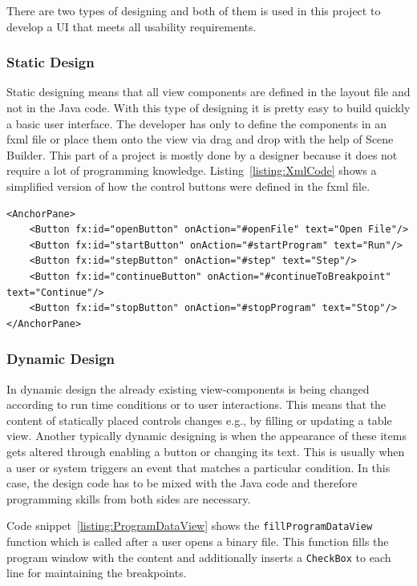 There are two types of designing and both of them is used in this project to develop a UI that meets all usability requirements.

\subsubsection{Static Design}
Static designing means that all view components are defined in the layout file and not in the Java code. With this type of designing it is pretty easy to build quickly a basic user interface. The developer has only to define the components in an fxml file or place them onto the view via drag and drop with the help of Scene Builder. This part of a project is mostly done by a designer because it does not require a lot of programming knowledge. Listing~\ref{listing:XmlCode} shows a simplified version of how the control buttons were defined in the fxml file.
\lstset{language=XML,style=MyStyle}
\begin{lstlisting}[caption={FXML example}, label=listing:XmlCode]
<AnchorPane>
	<Button fx:id="openButton" onAction="#openFile" text="Open File"/>
	<Button fx:id="startButton" onAction="#startProgram" text="Run"/>
	<Button fx:id="stepButton" onAction="#step" text="Step"/>
	<Button fx:id="continueButton" onAction="#continueToBreakpoint" text="Continue"/>
	<Button fx:id="stopButton" onAction="#stopProgram" text="Stop"/>
</AnchorPane>
\end{lstlisting}

\subsubsection{Dynamic Design}
In dynamic design the already existing view-components is being changed according to run time conditions or to user interactions. This means that the content of statically placed controls changes e.g., by filling or updating a table view. Another typically dynamic designing is when the appearance of these items gets altered through enabling a button or changing its text. This is usually when a user or system triggers an event that matches a particular condition. In this case, the design code has to be mixed with the Java code and therefore programming skills from both sides are necessary. 

Code snippet~\ref{listing:ProgramDataView} shows the \lstinline$fillProgramDataView$ function which is called after a user opens a binary file. This function fills the program window with the content and additionally inserts a \lstinline$CheckBox$ to each line for maintaining the breakpoints.

